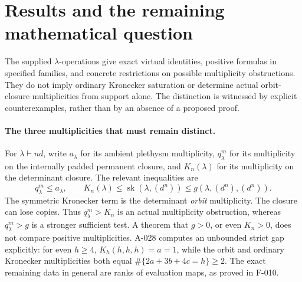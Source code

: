 \section*{Results and the remaining mathematical question}

The supplied \(\lambda\)-operations give exact virtual identities,
positive formulas in specified families, and concrete restrictions on
possible multiplicity obstructions. They do not imply ordinary
Kronecker saturation or determine actual orbit-closure multiplicities
from support alone. The distinction is witnessed by explicit
counterexamples, rather than by an absence of a proposed proof.

\paragraph{The three multiplicities that must remain distinct.}
For \(\lambda\vdash nd\), write \(a_\lambda\) for its ambient
plethysm multiplicity, \(q^m_\lambda\) for its multiplicity on the
internally padded permanent closure, and \(K_n(\lambda)\) for
its multiplicity on the determinant closure. The relevant inequalities
are
\[
 q^m_\lambda\leq a_\lambda,\qquad
 K_n(\lambda)\leq\operatorname{sk}(\lambda,(d^n))
                         \leq g(\lambda,(d^n),(d^n)).
\]
The symmetric Kronecker term is the determinant \emph{orbit}
multiplicity. The closure can lose copies. Thus \(q^m_\lambda>K_n\)
is an actual multiplicity obstruction, whereas \(q^m_\lambda>g\)
is a stronger sufficient test. A theorem that \(g>0\), or even
\(K_n>0\), does not compare positive multiplicities. A-028 computes an unbounded strict gap explicitly: for even \(h\geq4\),
\(K_h(h,h,h)=a=1\), while the orbit and ordinary Kronecker
multiplicities both equal \(\#\{2a+3b+4c=h\}\geq2\).
The exact remaining data in general are ranks of evaluation maps,
as proved in F-010.

